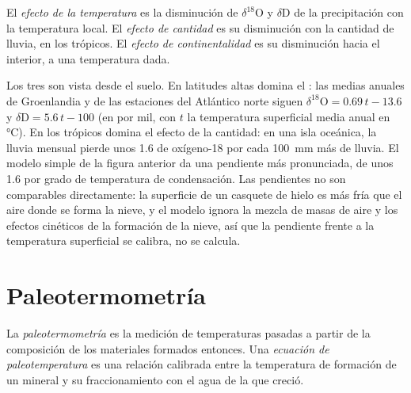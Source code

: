 \begin{definition}\label{def:b3:stable-isotopes:effects}
El \emph{efecto de la temperatura} es la
disminución de $\delta^{18}\mathrm O$ y $\delta\mathrm D$ de la precipitación con la
temperatura local. El \emph{efecto de cantidad} es su
disminución con la cantidad de lluvia, en los trópicos. El \emph{efecto de
continentalidad} es su disminución hacia el interior, a una
temperatura dada.
\end{definition}

Los tres son  vista desde el suelo. En latitudes altas
domina el : las medias anuales de Groenlandia y de las estaciones del
Atlántico norte siguen $\delta^{18}\mathrm O = 0.69\,t - 13.6$ y $\delta\mathrm D =
5.6\,t - 100$ (en por mil, con $t$ la temperatura superficial media anual en
\unit{\celsius}). En los trópicos domina el efecto de la cantidad: en una isla
oceánica, la lluvia mensual pierde unos \qty{1.6}{\permil} de oxígeno-18 por cada
\qty{100}{mm} más de lluvia. El modelo simple de la figura anterior da una pendiente más
pronunciada, de unos \qty{1.6}{\permil} por grado de temperatura de condensación. Las
pendientes no son comparables directamente: la superficie de un casquete de hielo es más fría
que el aire donde se forma la nieve, y el modelo ignora la mezcla de
masas de aire y los efectos cinéticos de la formación de la nieve, así que la pendiente frente a la
temperatura superficial se calibra, no se calcula.

\section{Paleotermometría}\label{sec:b3:stable-isotopes:palaeothermometry}

\begin{definition}
\label{def:b3:stable-isotopes:palaeothermometry}
La \emph{paleotermometría} es la medición de temperaturas pasadas
a partir de la composición de los materiales formados entonces. Una
\emph{ecuación de paleotemperatura} es una
relación calibrada entre la temperatura de formación de un mineral y su
fraccionamiento con el agua de la que creció.
\end{definition}

